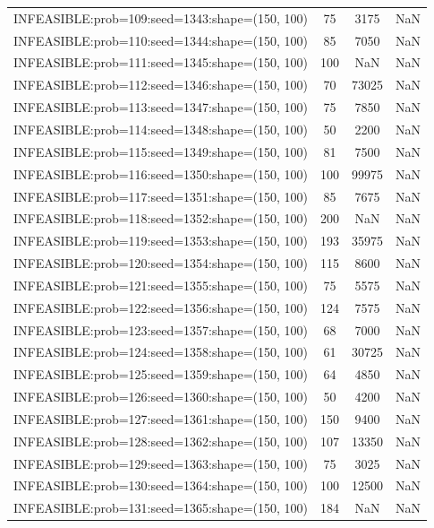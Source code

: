 \begin{longtable}{lccc}
INFEASIBLE:prob=109:seed=1343:shape=(150, 100) &    75 &  3175 &    NaN \\
INFEASIBLE:prob=110:seed=1344:shape=(150, 100) &    85 &  7050 &    NaN \\
INFEASIBLE:prob=111:seed=1345:shape=(150, 100) &   100 &   NaN &    NaN \\
INFEASIBLE:prob=112:seed=1346:shape=(150, 100) &    70 & 73025 &    NaN \\
INFEASIBLE:prob=113:seed=1347:shape=(150, 100) &    75 &  7850 &    NaN \\
INFEASIBLE:prob=114:seed=1348:shape=(150, 100) &    50 &  2200 &    NaN \\
INFEASIBLE:prob=115:seed=1349:shape=(150, 100) &    81 &  7500 &    NaN \\
INFEASIBLE:prob=116:seed=1350:shape=(150, 100) &   100 & 99975 &    NaN \\
INFEASIBLE:prob=117:seed=1351:shape=(150, 100) &    85 &  7675 &    NaN \\
INFEASIBLE:prob=118:seed=1352:shape=(150, 100) &   200 &   NaN &    NaN \\
INFEASIBLE:prob=119:seed=1353:shape=(150, 100) &   193 & 35975 &    NaN \\
INFEASIBLE:prob=120:seed=1354:shape=(150, 100) &   115 &  8600 &    NaN \\
INFEASIBLE:prob=121:seed=1355:shape=(150, 100) &    75 &  5575 &    NaN \\
INFEASIBLE:prob=122:seed=1356:shape=(150, 100) &   124 &  7575 &    NaN \\
INFEASIBLE:prob=123:seed=1357:shape=(150, 100) &    68 &  7000 &    NaN \\
INFEASIBLE:prob=124:seed=1358:shape=(150, 100) &    61 & 30725 &    NaN \\
INFEASIBLE:prob=125:seed=1359:shape=(150, 100) &    64 &  4850 &    NaN \\
INFEASIBLE:prob=126:seed=1360:shape=(150, 100) &    50 &  4200 &    NaN \\
INFEASIBLE:prob=127:seed=1361:shape=(150, 100) &   150 &  9400 &    NaN \\
INFEASIBLE:prob=128:seed=1362:shape=(150, 100) &   107 & 13350 &    NaN \\
INFEASIBLE:prob=129:seed=1363:shape=(150, 100) &    75 &  3025 &    NaN \\
INFEASIBLE:prob=130:seed=1364:shape=(150, 100) &   100 & 12500 &    NaN \\
INFEASIBLE:prob=131:seed=1365:shape=(150, 100) &   184 &   NaN &    NaN \\

\end{longtable}
